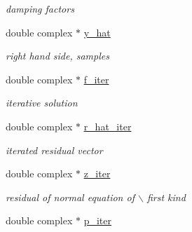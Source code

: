 \begin{CompactItemize}
\begin{CompactList}\small\item\em damping factors \item\end{CompactList}\item 
\hypertarget{structimri__inh__2d1d__adjoint__plan_o4}{
double complex $\ast$ \hyperlink{structimri__inh__2d1d__adjoint__plan_o4}{y\_\-hat}}
\label{structimri__inh__2d1d__adjoint__plan_o4}

\begin{CompactList}\small\item\em right hand side, samples \item\end{CompactList}\item 
\hypertarget{structimri__inh__2d1d__adjoint__plan_o5}{
double complex $\ast$ \hyperlink{structimri__inh__2d1d__adjoint__plan_o5}{f\_\-iter}}
\label{structimri__inh__2d1d__adjoint__plan_o5}

\begin{CompactList}\small\item\em iterative solution \item\end{CompactList}\item 
\hypertarget{structimri__inh__2d1d__adjoint__plan_o6}{
double complex $\ast$ \hyperlink{structimri__inh__2d1d__adjoint__plan_o6}{r\_\-hat\_\-iter}}
\label{structimri__inh__2d1d__adjoint__plan_o6}

\begin{CompactList}\small\item\em iterated residual vector \item\end{CompactList}\item 
\hypertarget{structimri__inh__2d1d__adjoint__plan_o7}{
double complex $\ast$ \hyperlink{structimri__inh__2d1d__adjoint__plan_o7}{z\_\-iter}}
\label{structimri__inh__2d1d__adjoint__plan_o7}

\begin{CompactList}\small\item\em residual of normal equation of $\backslash$ first kind \item\end{CompactList}\item 
\hypertarget{structimri__inh__2d1d__adjoint__plan_o8}{
double complex $\ast$ \hyperlink{structimri__inh__2d1d__adjoint__plan_o8}{p\_\-iter}}
\label{structimri__inh__2d1d__adjoint__plan_o8}


\end{CompactItemize}
